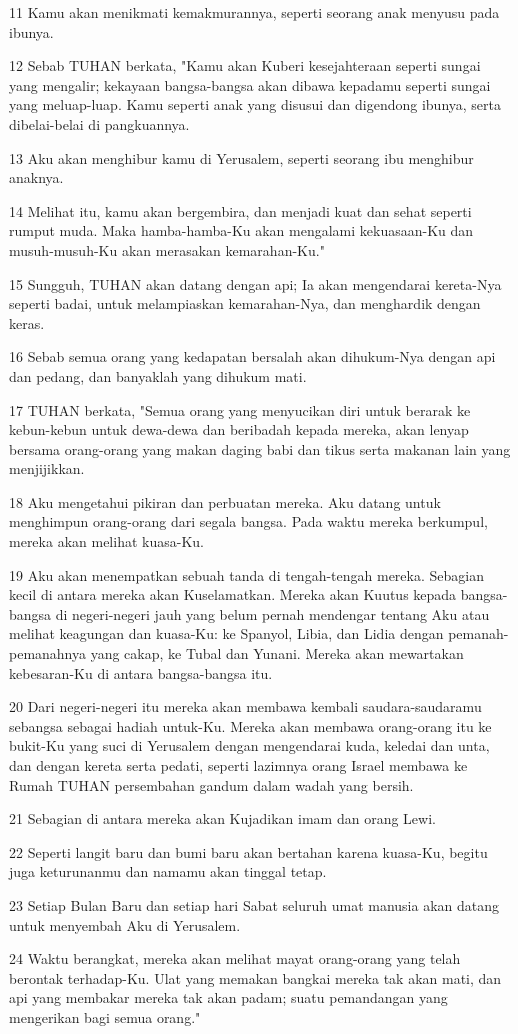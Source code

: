 \par 11 Kamu akan menikmati kemakmurannya, seperti seorang anak menyusu pada ibunya.
\par 12 Sebab TUHAN berkata, "Kamu akan Kuberi kesejahteraan seperti sungai yang mengalir; kekayaan bangsa-bangsa akan dibawa kepadamu seperti sungai yang meluap-luap. Kamu seperti anak yang disusui dan digendong ibunya, serta dibelai-belai di pangkuannya.
\par 13 Aku akan menghibur kamu di Yerusalem, seperti seorang ibu menghibur anaknya.
\par 14 Melihat itu, kamu akan bergembira, dan menjadi kuat dan sehat seperti rumput muda. Maka hamba-hamba-Ku akan mengalami kekuasaan-Ku dan musuh-musuh-Ku akan merasakan kemarahan-Ku."
\par 15 Sungguh, TUHAN akan datang dengan api; Ia akan mengendarai kereta-Nya seperti badai, untuk melampiaskan kemarahan-Nya, dan menghardik dengan keras.
\par 16 Sebab semua orang yang kedapatan bersalah akan dihukum-Nya dengan api dan pedang, dan banyaklah yang dihukum mati.
\par 17 TUHAN berkata, "Semua orang yang menyucikan diri untuk berarak ke kebun-kebun untuk dewa-dewa dan beribadah kepada mereka, akan lenyap bersama orang-orang yang makan daging babi dan tikus serta makanan lain yang menjijikkan.
\par 18 Aku mengetahui pikiran dan perbuatan mereka. Aku datang untuk menghimpun orang-orang dari segala bangsa. Pada waktu mereka berkumpul, mereka akan melihat kuasa-Ku.
\par 19 Aku akan menempatkan sebuah tanda di tengah-tengah mereka. Sebagian kecil di antara mereka akan Kuselamatkan. Mereka akan Kuutus kepada bangsa-bangsa di negeri-negeri jauh yang belum pernah mendengar tentang Aku atau melihat keagungan dan kuasa-Ku: ke Spanyol, Libia, dan Lidia dengan pemanah-pemanahnya yang cakap, ke Tubal dan Yunani. Mereka akan mewartakan kebesaran-Ku di antara bangsa-bangsa itu.
\par 20 Dari negeri-negeri itu mereka akan membawa kembali saudara-saudaramu sebangsa sebagai hadiah untuk-Ku. Mereka akan membawa orang-orang itu ke bukit-Ku yang suci di Yerusalem dengan mengendarai kuda, keledai dan unta, dan dengan kereta serta pedati, seperti lazimnya orang Israel membawa ke Rumah TUHAN persembahan gandum dalam wadah yang bersih.
\par 21 Sebagian di antara mereka akan Kujadikan imam dan orang Lewi.
\par 22 Seperti langit baru dan bumi baru akan bertahan karena kuasa-Ku, begitu juga keturunanmu dan namamu akan tinggal tetap.
\par 23 Setiap Bulan Baru dan setiap hari Sabat seluruh umat manusia akan datang untuk menyembah Aku di Yerusalem.
\par 24 Waktu berangkat, mereka akan melihat mayat orang-orang yang telah berontak terhadap-Ku. Ulat yang memakan bangkai mereka tak akan mati, dan api yang membakar mereka tak akan padam; suatu pemandangan yang mengerikan bagi semua orang."


